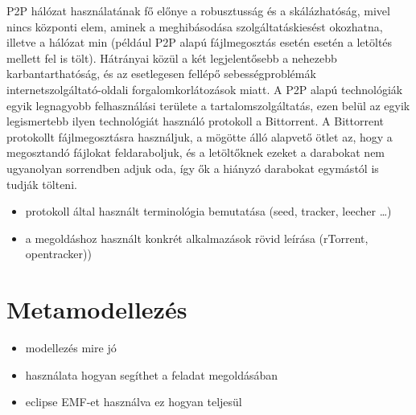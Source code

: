 P2P hálózat használatának fő előnye a robusztusság és a skálázhatóság, mivel nincs központi elem,
aminek a meghibásodása szolgáltatáskiesést okozhatna, illetve a hálózat min (például P2P alapú fájlmegosztás esetén esetén a letöltés
mellett fel is tölt). Hátrányai közül a két legjelentősebb a nehezebb karbantarthatóság, és az
esetlegesen fellépő sebességproblémák internetszolgáltató-oldali forgalomkorlátozások miatt.
A P2P alapú technológiák egyik legnagyobb felhasználási területe a tartalomszolgáltatás, ezen belül
az egyik legismertebb ilyen technológiát használó protokoll a Bittorrent. A Bittorrent~\cite{cohen2008bittorrent} protokollt
fájlmegosztásra használjuk, a mögötte álló alapvető ötlet az, hogy a megosztandó fájlokat
feldaraboljuk, és a letöltőknek ezeket a darabokat nem ugyanolyan sorrendben adjuk oda, így ők a
hiányzó darabokat egymástól is tudják tölteni. 

\begin{itemize}
  \item protokoll által használt terminológia bemutatása (seed, tracker, leecher \ldots)
  \item a megoldáshoz használt konkrét alkalmazások rövid leírása (rTorrent, opentracker))
\end{itemize}


\section{Metamodellezés}
\begin{itemize}
  \item modellezés mire jó
  \item	használata hogyan segíthet a feladat megoldásában
  \item eclipse EMF-et használva ez hogyan teljesül
\end{itemize}